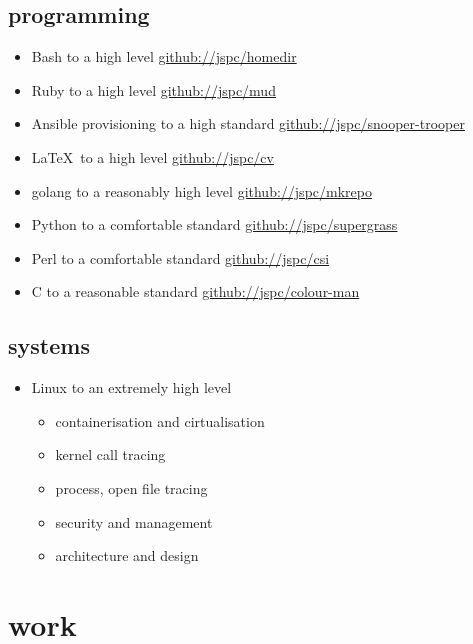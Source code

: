 \documentclass[]{friggeri-cv}
\begin{document}
\subsection{programming}

\begin{itemize}
\item Bash to a high level \href{https://github.com/jspc/homedir}{github://jspc/homedir}
\item Ruby to a high level \href{https://github.com/jspc/mud}{github://jspc/mud}
\item Ansible provisioning to a high standard \href{https://github.com/jspc/snooper-trooper}{github://jspc/snooper-trooper}
\item \LaTeX \ to a high level \href{https://github.com/jspc/cv}{github://jspc/cv}
\item golang to a reasonably high level \href{https://github.com/jspc/mkrepo}{github://jspc/mkrepo}
\item Python to a comfortable standard \href{https://github.com/jspc/supergrass}{github://jspc/supergrass}
\item Perl to a comfortable standard \href{https://github.com/jspc/csi}{github://jspc/csi}
\item C to a reasonable standard \href{https://github.com/jspc/colour-man}{github://jspc/colour-man}
\end{itemize}

\subsection{systems}

\begin{itemize}
\item Linux to an extremely high level
  \begin{itemize}
  \item containerisation and cirtualisation
  \item kernel call tracing
  \item process, open file tracing
  \item security and management
  \item architecture and design
  \end{itemize}
\end{itemize}

\section{work}
\end{document}
